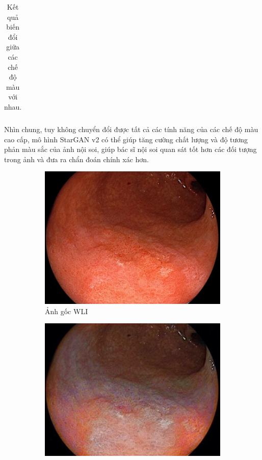 \documentclass[12pt]{extreport}
\begin{document}
\begin{table}[H]
\begin{tabular}{c | c | c | c | c}
    \end{tabular}
    \caption{Kết quả biến đổi giữa các chế độ màu với nhau.}
\end{table}

Nhìn chung, tuy không chuyển đổi được tất cả các tính năng của các chế độ màu cao cấp, mô hình StarGAN v2 có thể giúp tăng cường chất lượng và độ tương phản màu sắc của ảnh nội soi, giúp bác sĩ nội soi quan sát tốt hơn các đối tượng trong ảnh và đưa ra chẩn đoán chính xác hơn.

\begin{figure}[H]
    \centering
    \begin{subfigure}[H]{0.32\textwidth}
        \centering
        \includegraphics[width=\linewidth]{example/wli.png}
        \caption{Ảnh gốc WLI}
    \end{subfigure}
    \begin{subfigure}[H]{0.32\textwidth}
        \centering
        \includegraphics[width=\linewidth]{example/lci.jpeg}

\end{subfigure}
\end{figure}
\end{document}
